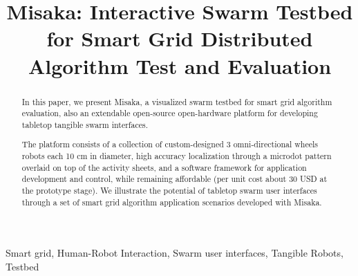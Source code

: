\documentclass[conference]{IEEEtran}
\begin{document}
\title{Misaka: Interactive Swarm Testbed for Smart Grid Distributed Algorithm Test and Evaluation\\}

\author{
\and
{}
\and
{}
\and
{}
}

\maketitle

\begin{abstract}
    In this paper, we present Misaka, a visualized swarm testbed for smart grid algorithm evaluation, also an extendable open-source open-hardware platform for developing tabletop tangible swarm interfaces.

    The platform consists of a collection of custom-designed 3 omni-directional wheels robots each 10 cm in diameter, high accuracy localization through a microdot pattern overlaid on top of the activity sheets, and a software framework for application development and control, while remaining affordable (per unit cost about 30 USD at the prototype stage). We illustrate the potential of tabletop swarm user interfaces through a set of smart grid algorithm application scenarios developed with Misaka.
\end{abstract}

\begin{IEEEkeywords}
    Smart grid, Human-Robot Interaction, Swarm user interfaces, Tangible Robots, Testbed
\end{IEEEkeywords}
\end{document}
